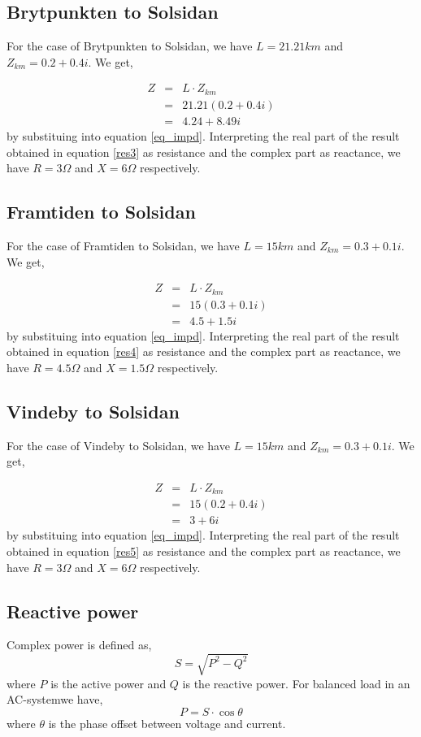 \documentclass{report}
\newcommand{\case}[1]{\subsection*{#1}}
\newcommand{\ac}{AC-system}
\newcommand{\cmp}[2]{\ensuremath{#1+#2i}}
\begin{document}
\case {Brytpunkten to Solsidan}
For the case of Brytpunkten to Solsidan, we have $L=21.21km$ and $Z_{km}=\cmp{0.2}{0.4}$.  We get,

\begin{eqnarray}
Z&=&  L \cdot Z_{km} \\
&=&21.21 (\cmp{0.2}{0.4}) \\
&=& \cmp{4.24}{8.49} \label{res3}
\end{eqnarray} by substituing into equation \ref{eq_impd}. Interpreting the real part of the result obtained in equation \ref{res3} as resistance and the complex part as reactance, we have $R=3\Omega$ and $X=6\Omega$ respectively.

\case {Framtiden to Solsidan}
For the case of Framtiden to Solsidan, we have $L=15km$ and $Z_{km}=\cmp{0.3}{0.1}$.  We get,

\begin{eqnarray}
Z&=&  L \cdot Z_{km} \\
&=&15 (\cmp{0.3}{0.1}) \\
&=& \cmp{4.5}{1.5} \label{res4}
\end{eqnarray} by substituing into equation \ref{eq_impd}. Interpreting the real part of the result obtained in equation \ref{res4} as resistance and the complex part as reactance, we have $R=4.5\Omega$ and $X=1.5\Omega$ respectively.

\case {Vindeby to Solsidan}
For the case of Vindeby to Solsidan, we have $L=15km$ and $Z_{km}=\cmp{0.3}{0.1}$.  We get,

\begin{eqnarray}
Z&=&  L \cdot Z_{km} \\
&=&15 (\cmp{0.2}{0.4}) \\
&=& \cmp{3}{6} \label{res5}
\end{eqnarray} by substituing into equation \ref{eq_impd}. Interpreting the real part of the result obtained in equation \ref{res5} as resistance and the complex part as reactance, we have $R=3\Omega$ and $X=6\Omega$ respectively.

\subsection{Reactive power}
Complex power is defined as, \begin{equation}
S = \sqrt{P^2 - Q^2} \label{s}
\end{equation}
where $P$ is the active power and $Q$ is the reactive power. For balanced load in an \ac we have, 
\begin{equation}
P = S \cdot \cos\theta
\end{equation}
where $\theta$ is the phase offset between voltage and current. 
\end{document}
